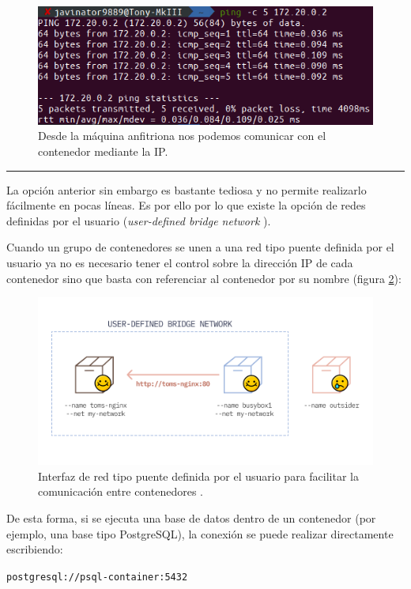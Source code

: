 \begin{figure}[H]
    \centering
    \includegraphics[width=.6\linewidth]{pictures/container-ping.png}
    \caption{Desde la máquina anfitriona nos podemos comunicar con el contenedor mediante la IP.}
    \label{fig:ping}
\end{figure}

\noindent\rule{\linewidth}{.2pt}

La opción anterior sin embargo es bastante tediosa y no permite realizarlo fácilmente
en pocas líneas. Es por ello por lo que existe la opción de redes definidas por el
usuario (\textit{user-defined bridge network} \cite{donohueHowCommunicateDocker2020}).

Cuando un grupo de contenedores se unen a una red tipo puente definida por el usuario
ya no es necesario tener el control sobre la dirección IP de cada contenedor
sino que basta con referenciar al contenedor por su nombre (figura \ref{fig:user-defined-network}):

\begin{figure}[H]
    \centering
    \includegraphics[width=.7\linewidth]{pictures/user-defined-bridge.png}
    \caption{Interfaz de red tipo puente definida por el usuario para facilitar la comunicación entre contenedores \cite{donohueHowCommunicateDocker2020}.}
    \label{fig:user-defined-network}
\end{figure}

De esta forma, si se ejecuta una base de datos dentro de un contenedor (por ejemplo,
una base tipo PostgreSQL), la conexión se puede realizar directamente escribiendo:

\begin{center}
    \texttt{postgresql://psql-container:5432}
\end{center}

